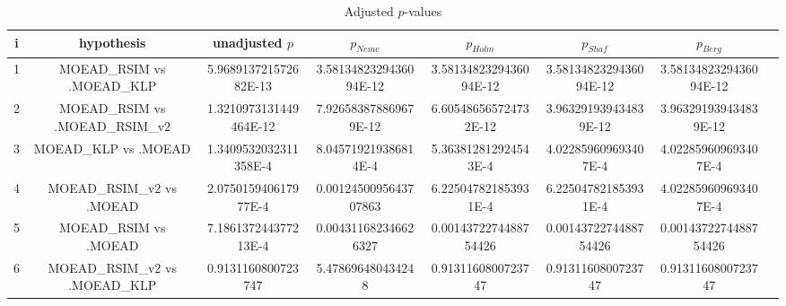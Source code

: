 \documentclass[a4paper,10pt]{article}
\begin{document}
\begin{landscape}
\begin{table}[!htp]
\centering\tiny
\caption{Adjusted $p$-values}
\begin{tabular}{cccccccc}
i&hypothesis&unadjusted $p$&$p_{Neme}$&$p_{Holm}$&$p_{Shaf}$&$p_{Berg}$\\
\hline
1&MOEAD_RSIM vs .MOEAD_KLP&5.968913721572682E-13&3.5813482329436094E-12&3.5813482329436094E-12&3.5813482329436094E-12&3.5813482329436094E-12\\
2&MOEAD_RSIM vs .MOEAD_RSIM_v2&1.3210973131449464E-12&7.926583878869679E-12&6.605486565724732E-12&3.963291939434839E-12&3.963291939434839E-12\\
3&MOEAD_KLP vs .MOEAD&1.3409532032311358E-4&8.045719219386814E-4&5.363812812924543E-4&4.022859609693407E-4&4.022859609693407E-4\\
4&MOEAD_RSIM_v2 vs .MOEAD&2.075015940617977E-4&0.0012450095643707863&6.225047821853931E-4&6.225047821853931E-4&4.022859609693407E-4\\
5&MOEAD_RSIM vs .MOEAD&7.186137244377213E-4&0.004311682346626327&0.0014372274488754426&0.0014372274488754426&0.0014372274488754426\\
6&MOEAD_RSIM_v2 vs .MOEAD_KLP&0.9131160800723747&5.478696480434248&0.9131160800723747&0.9131160800723747&0.9131160800723747\\
\hline
\end{tabular}
\end{table}

\end{landscape}
\end{document}
